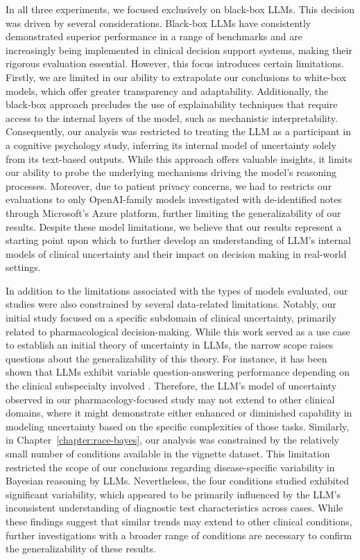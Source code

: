 In all three experiments, we focused exclusively on black-box LLMs. This decision was driven by several considerations. Black-box LLMs have consistently demonstrated superior performance in a range of benchmarks and are increasingly being implemented in clinical decision support systems, making their rigorous evaluation essential. However, this focus introduces certain limitations. Firstly, we are limited in our ability to extrapolate our conclusions to white-box models, which offer greater transparency and adaptability. Additionally, the black-box approach precludes the use of explainability techniques that require access to the internal layers of the model, such as mechanistic interpretability. Consequently, our analysis was restricted to treating the LLM as a participant in a cognitive psychology study, inferring its internal model of uncertainty solely from its text-based outputs. While this approach offers valuable insights, it limits our ability to probe the underlying mechanisms driving the model's reasoning processes. Moreover, due to patient privacy concerns, we had to restricts our evaluations to only OpenAI-family models investigated with de-identified notes through Microsoft's Azure platform, further limiting the generalizability of our results. Despite these model limitations, we believe that our results represent a starting point upon which to further develop an understanding of LLM's internal models of clinical uncertainty and their impact on decision making in real-world settings. 

In addition to the limitations associated with the types of models evaluated, our studies were also constrained by several data-related limitations. Notably, our initial study focused on a specific subdomain of clinical uncertainty, primarily related to pharmacological decision-making. While this work served as a use case to establish an initial theory of uncertainty in LLMs, the narrow scope raises questions about the generalizability of this theory. For instance, it has been shown that LLMs exhibit variable question-answering performance depending on the clinical subspecialty involved \citep{thirunavukarasuTriallingLargeLanguage2023}. Therefore, the LLM's model of uncertainty observed in our pharmacology-focused study may not extend to other clinical domains, where it might demonstrate either enhanced or diminished capability in modeling uncertainty based on the specific complexities of those tasks. Similarly, in Chapter~\ref{chapter:race-bayes}, our analysis was constrained by the relatively small number of conditions available in the vignette dataset. This limitation restricted the scope of our conclusions regarding disease-specific variability in Bayesian reasoning by LLMs. Nevertheless, the four conditions studied exhibited significant variability, which appeared to be primarily influenced by the LLM's inconsistent understanding of diagnostic test characteristics across cases. While these findings suggest that similar trends may extend to other clinical conditions, further investigations with a broader range of conditions are necessary to confirm the generalizability of these results.

